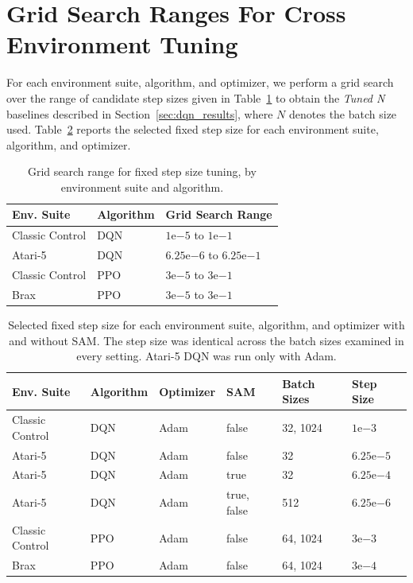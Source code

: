 \FloatBarrier
\section{Grid Search Ranges For Cross Environment Tuning} \label{app_tuning_ranges}
For each environment suite, algorithm, and optimizer, we perform a grid search over the range of candidate step sizes given in Table~\ref{tab:tuning_ranges} to obtain the \textit{Tuned N} baselines described in Section~\ref{sec:dqn_results}, where $N$ denotes the batch size used. Table~\ref{tab:tuned_n} reports the selected fixed step size for each environment suite, algorithm, and optimizer. 

\begin{table}[htbp]
\centering
\small
\setlength{\tabcolsep}{6pt}
\renewcommand{\arraystretch}{1.2}
\begin{tabular}{@{}l l l@{}}
\toprule
Env. Suite & Algorithm & Grid Search Range \\
\midrule
Classic Control & DQN & $1\mathrm{e}{-5}$ to $1\mathrm{e}{-1}$ \\
Atari-5 & DQN & $6.25\mathrm{e}{-6}$ to $6.25\mathrm{e}{-1}$ \\
Classic Control & PPO & $3\mathrm{e}{-5}$ to $3\mathrm{e}{-1}$ \\
Brax & PPO & $3\mathrm{e}{-5}$ to $3\mathrm{e}{-1}$ \\
\bottomrule
\end{tabular}
\caption{Grid search range for fixed step size tuning, by environment suite and algorithm.}
\label{tab:tuning_ranges}
\end{table}

\begin{table}[htbp]
\centering
\small
\setlength{\tabcolsep}{6pt}
\renewcommand{\arraystretch}{1.2}
\begin{tabular}{@{}l l l l l l@{}}
\toprule
Env. Suite & Algorithm & Optimizer & SAM & Batch Sizes & Step Size \\
\midrule
Classic Control & DQN & Adam & false & 32, 1024 & $1\mathrm{e}{-3}$ \\
Atari-5 & DQN & Adam & false & 32 & $6.25\mathrm{e}{-5}$ \\
Atari-5 & DQN & Adam & true & 32 & $6.25\mathrm{e}{-4}$ \\
Atari-5 & DQN & Adam & true, false & 512 & $6.25\mathrm{e}{-6}$ \\
Classic Control & PPO & Adam & false & 64, 1024 & $3\mathrm{e}{-3}$ \\
Brax & PPO & Adam & false & 64, 1024 & $3\mathrm{e}{-4}$ \\
\bottomrule
\end{tabular}
\caption[Selected fixed step size for each environment suite, algorithm, and optimizer.]{Selected fixed step size for each environment suite, algorithm, and optimizer with and without SAM. The step size was identical across the batch sizes examined in every setting. Atari-5 DQN was run only with Adam.}
\label{tab:tuned_n}
\end{table}

